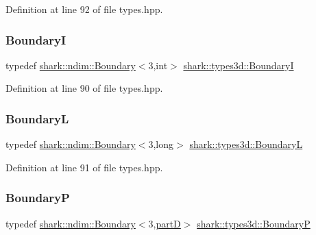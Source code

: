 Definition at line 92 of file types.\+hpp.

\hypertarget{namespaceshark_1_1types3d_a045f7fae1a016d00a39f36f1dfc16e65}{}\label{namespaceshark_1_1types3d_a045f7fae1a016d00a39f36f1dfc16e65} 
\subsubsection{\texorpdfstring{BoundaryI}{BoundaryI}}
{\footnotesize\ttfamily typedef \hyperlink{classshark_1_1ndim_1_1_boundary}{shark\+::ndim\+::\+Boundary}$<$3,int$>$ \hyperlink{namespaceshark_1_1types3d_a045f7fae1a016d00a39f36f1dfc16e65}{shark\+::types3d\+::\+BoundaryI}}



Definition at line 90 of file types.\+hpp.

\hypertarget{namespaceshark_1_1types3d_ae79df5e696fb92ea1db5c496e62c40cc}{}\label{namespaceshark_1_1types3d_ae79df5e696fb92ea1db5c496e62c40cc} 
\subsubsection{\texorpdfstring{BoundaryL}{BoundaryL}}
{\footnotesize\ttfamily typedef \hyperlink{classshark_1_1ndim_1_1_boundary}{shark\+::ndim\+::\+Boundary}$<$3,long$>$ \hyperlink{namespaceshark_1_1types3d_ae79df5e696fb92ea1db5c496e62c40cc}{shark\+::types3d\+::\+BoundaryL}}



Definition at line 91 of file types.\+hpp.

\hypertarget{namespaceshark_1_1types3d_a1a7624113c85fce0b5558f4398b88171}{}\label{namespaceshark_1_1types3d_a1a7624113c85fce0b5558f4398b88171} 
\subsubsection{\texorpdfstring{BoundaryP}{BoundaryP}}
{\footnotesize\ttfamily typedef \hyperlink{classshark_1_1ndim_1_1_boundary}{shark\+::ndim\+::\+Boundary}$<$3,\hyperlink{namespaceshark_1_1types3d_a8ba1ca83346f7674ce78342d0dc516ce}{partD}$>$ \hyperlink{namespaceshark_1_1types3d_a1a7624113c85fce0b5558f4398b88171}{shark\+::types3d\+::\+BoundaryP}}




